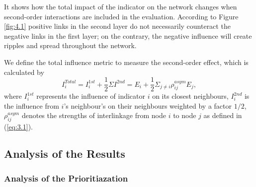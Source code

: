 \documentclass[12pt]{article}  %
\begin{document}
It shows how the total impact of the indicator on the network changes when second-order interactions are included in the evaluation. According to Figure \ref{fig:4.1} positive links in the second layer do not necessarily counteract the negative links in the first layer; on the contrary, the negative influence will create ripples and spread throughout the network.
\begin{comment}
为了生成可以指导确定优先级的信息，需要提高警惕以避免造成负面影响的因素，我们需要考虑一个行为造成的影响如何在网络中蔓延。如果一个指标强化了另一个指标，而另一个指标又与其他指标有着强烈的正向联系，那么原始指标对整个系统的影响是非常显著的。然而，如果另一个指标的正向联系很少或很弱，那么积极效应很快就会消失，不会产生太多的系统性影响。甚至，另一个指标反过来又对其他指标产生大量负面影响，从而产生负面的系统影响，这种情况是需要避免的。同样的，A negative connection to a target that in turn has strong positive connections may be a reason for caution as negative impact can spread.（这句很好 我直接粘英文）。
为了验证如果考虑到二阶效应，指标的优先级将会改变的假设，我们计算了我们选择的指标对二阶网络的总影响。也就是说，我们包括了邻近指标的邻居（neighbouring indicator’s neighbour）的影响。图7显示了从只考虑一阶交互到二阶交互的概念思想【这里可以画个示意图到时候】它显示了如果我们在评估中包括二阶相互作用，指标对网络产生的总影响是如何变化的。图7强调了第二层中的正链接并不一定能抵消第一层中的负链接，相反，负影响会在网络中产生涟漪并扩散。
\end{comment}

We define the total influence metric to measure the second-order effect, which is calculated by
\begin{equation}
    I_i^{Total}=I_i^{1st}+\frac{1}{2}\Sigma I^{2nd}=E_i+\frac{1}{2}\Sigma_{j\ne i}\rho_{ij}^{asym}E_j,
\end{equation}
where    $I_i^{1st}$ represents the influence of indicator $i$ on its closest neighbours, $I_i^{2nd}$ is the influence from $i$'s neighbour's on their neighbours weighted by a factor $1/2$, $\rho_{ij}^{asym}$ denotes the strengths of interlinkage from node $i$ to node $j$ as defined in (\ref{eq:3.1}).


\subsection{Analysis of the Results}
\subsubsection{Analysis of the Prioritiazation}
\end{document}
